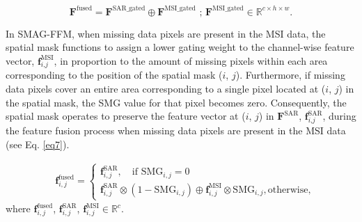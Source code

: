 \documentclass[preprint,12pt,authoryear]{elsarticle}
\begin{document}
\begin{equation}
\label{eq6}
    \mathbf{F}^{\text{fused}} = \mathbf{F}^{\text{SAR\_gated}} \oplus \mathbf{F}^{\text{MSI\_gated}} 
    \text{ ; } \mathbf{F}^{\text{MSI\_gated}} \in \mathbb{R}^{c \times h \times w}.
\end{equation}

In SMAG-FFM, when missing data pixels are present in the MSI data, the spatial mask functions to assign a lower gating weight to the channel-wise feature vector, $\mathbf{f}^{\text{MSI}}_{i \text{,} j}$, in proportion to the amount of missing pixels within each area corresponding to the position of the spatial mask ($i$, $j$). Furthermore, if missing data pixels cover an entire area corresponding to a single pixel located at ($i$, $j$) in the spatial mask, the SMG value for that pixel becomes zero. Consequently, the spatial mask operates to preserve the feature vector at ($i$, $j$) in $\mathbf{F}^{\text{SAR}}$, $\mathbf{f}^{\text{SAR}}_{i \text{,} j}$, during the feature fusion process when missing data pixels are present in the MSI data (see Eq. \ref{eq7}).


\begin{equation}
\label{eq7}
\begin{aligned}
    &\mathbf{f}^{\text{fused}}_{i,j} = \begin{cases}
    \mathbf{f}_{i,j}^{\text{SAR}}, \quad \text{if } \text{SMG}_{i,j} = 0 \\[2ex]
    \mathbf{f}_{i,j}^{\text{SAR}} \otimes (1 - \text{SMG}_{i,j}) \oplus  \mathbf{f}_{i,j}^{\text{MSI}} \otimes \text{SMG}_{i,j}, \text{otherwise,}
    \end{cases}
\end{aligned}
\end{equation}
where $\mathbf{f}_{i,j}^{\text{fused}}$, $\mathbf{f}_{i,j}^{\text{SAR}}$, $\mathbf{f}_{i,j}^{\text{MSI}} \in \mathbb{R}^c$.
\end{document}
